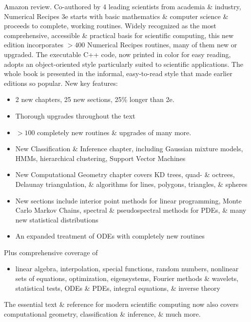 \documentclass{article}
\begin{document}
\begin{enumerate}
	{\sf Amazon review.} Co-authored by 4 leading scientists from academia \& industry, Numerical Recipes 3e starts with basic mathematics \& computer science \& proceeds to complete, working routines. Widely recognized as the most comprehensive, accessible \& practical basis for scientific computing, this new edition incorporates $> 400$ Numerical Recipes routines, many of them new or upgraded. The executable C++ code, now printed in color for easy reading, adopts an object-oriented style particularly suited to scientific applications. The whole book is presented in the informal, easy-to-read style that made earlier editions so popular. New key features:
	\begin{itemize}
		\item 2 new chapters, 25 new sections, 25\% longer than 2e.
		\item Thorough upgrades throughout the text
		\item $> 100$ completely new routines \& upgrades of many more.
		\item New Classification \& Inference chapter, including Gaussian mixture models, HMMs, hierarchical clustering, Support Vector Machines
		\item New Computational Geometry chapter covers KD trees, quad- \& octrees, Delaunay triangulation, \& algorithms for lines, polygons, triangles, \& spheres
		\item New sections include interior point methods for linear programming, Monte Carlo Markov Chains, spectral \& pseudospectral methods for PDEs, \& many new statistical distributions
		\item An expanded treatment of ODEs with completely new routines
	\end{itemize}
	Plus comprehensive coverage of
	\begin{itemize}
		\item linear algebra, interpolation, special functions, random numbers, nonlinear sets of equations, optimization, eigensystems, Fourier methods \& wavelets, statistical tests, ODEs \& PDEs, integral equations, \& inverse theory
	\end{itemize}
	The essential text \& reference for modern scientific computing now also covers computational geometry, classification \& inference, \& much more.


\end{enumerate}
\end{document}
